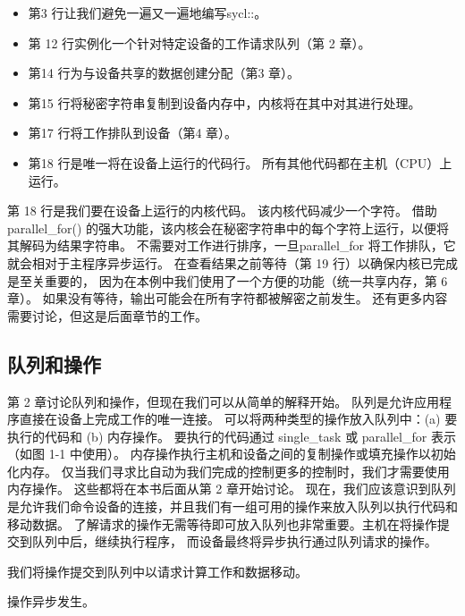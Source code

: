 \begin{itemize}
	\item 第3 行让我们避免一遍又一遍地编写sycl::。

	\item 第 12 行实例化一个针对特定设备的工作请求队列（第 2 章）。

	\item 第14 行为与设备共享的数据创建分配（第3 章）。

	\item 第15 行将秘密字符串复制到设备内存中，内核将在其中对其进行处理。

	\item 第17 行将工作排队到设备（第4 章）。

	\item 第18 行是唯一将在设备上运行的代码行。 所有其他代码都在主机（CPU）上运行。
\end{itemize}

第 18 行是我们要在设备上运行的内核代码。 该内核代码减少一个字符。 
借助parallel\_for() 的强大功能，该内核会在秘密字符串中的每个字符上运行，以便将其解码为结果字符串。 
不需要对工作进行排序，一旦parallel\_for 将工作排队，它就会相对于主程序异步运行。 
在查看结果之前等待（第 19 行）以确保内核已完成是至关重要的，
因为在本例中我们使用了一个方便的功能（统一共享内存，第 6 章）。 
如果没有等待，输出可能会在所有字符都被解密之前发生。 还有更多内容需要讨论，但这是后面章节的工作。

\subsection{队列和操作}
第 2 章讨论队列和操作，但现在我们可以从简单的解释开始。 队列是允许应用程序直接在设备上完成工作的唯一连接。 
可以将两种类型的操作放入队列中：(a) 要执行的代码和 (b) 内存操作。 
要执行的代码通过 single\_task 或 parallel\_for 表示（如图 1-1 中使用）。 
内存操作执行主机和设备之间的复制操作或填充操作以初始化内存。 
仅当我们寻求比自动为我们完成的控制更多的控制时，我们才需要使用内存操作。 这些都将在本书后面从第 2 章开始讨论。
现在，我们应该意识到队列是允许我们命令设备的连接，并且我们有一组可用的操作来放入队列以执行代码和移动数据。
了解请求的操作无需等待即可放入队列也非常重要。主机在将操作提交到队列中后，继续执行程序，
而设备最终将异步执行通过队列请求的操作。

\begin{remark}[队列将我们与设备连接起来]
我们将操作提交到队列中以请求计算工作和数据移动。
	
操作异步发生。
\end{remark}


